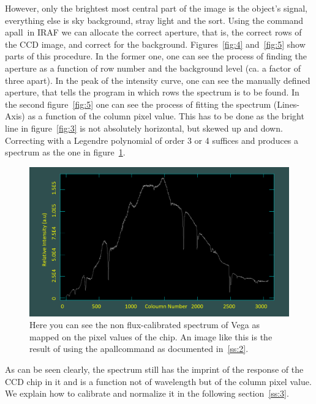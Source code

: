 \documentclass{article}
\begin{document}
However, only the brightest most central part of the image is the object's signal, everything else is sky background, stray light and the sort. Using the command \ldq apall\rdq ~in IRAF we can allocate the correct aperture, that is, the correct rows of the CCD image, and correct for the background.  Figures~\ref{fig:4} and~\ref{fig:5} show parts of this procedure. In the former one, one can see the process of finding the aperture as a function of row number and the background level (ca. a factor of three apart). In the peak of the intensity curve, one can see the manually defined aperture, that tells the program in which rows the spectrum is to be found. In the second figure~\ref{fig:5} one can see the process of fitting the spectrum (\ldq Lines\rdq-Axis) as a function of the column pixel value. This has to be done as the bright line in figure~\ref{fig:3} is not absolutely horizontal, but skewed up and down. Correcting with a Legendre polynomial of order 3 or 4 suffices and produces a spectrum as the one in figure~\ref{fig:6}. 
\begin{figure}[H]
  	\centering
	\includegraphics[width=1.00\textwidth]{spectroscopy/unnorm_uncalib_vega.png}
  	\caption{Here you can see the non flux-calibrated spectrum of Vega as mapped on the pixel values of the chip. An image like this is the result of using the \ldq apall\rdq command as documented in~\ref{ss:2}.}
  	\label{fig:6}
\end{figure}
As can be seen clearly, the spectrum still has the imprint of the response of the CCD chip in it and is a function not of wavelength but of the column pixel value. We explain how to calibrate and normalize it in the following section~\ref{ss:3}.
\end{document}
